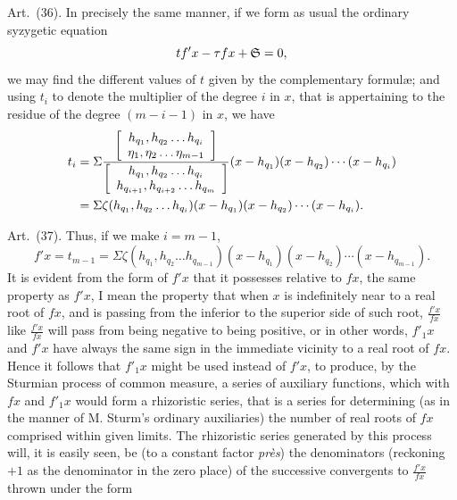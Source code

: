 \documentclass[11pt]{article}
\newcommand{\art}[1]{\par\smallskip\noindent Art.~(#1).\quad}
\begin{document}
\art{36} In precisely the same manner, if we form as usual the ordinary syzygetic equation
\[
tf'x-\tau fx+\mathfrak{S}=0,
\]
we may find the different values of $t$ given by the complementary formulæ; and using $t_i$ to denote the multiplier of the degree $i$ in $x$, that is appertaining to the residue of the degree $(m-i-1)$ in $x$, we have
\[
\begin{aligned}
t_i&=\Sigma
\frac{\left[\begin{array}{c}h_{q_1},h_{q_2}\ldots h_{q_i}\\\eta_1,\eta_2\ldots\eta_{m-1}\end{array}\right]}
{\left[\begin{array}{c}h_{q_1},h_{q_2}\ldots h_{q_i}\\h_{q_{i+1}},h_{q_{i+2}}\ldots h_{q_m}\end{array}\right]}
(x-h_{q_1})(x-h_{q_2})\cdots(x-h_{q_i})\\
&=\Sigma\zeta(h_{q_1},h_{q_2}\ldots h_{q_i})(x-h_{q_1})(x-h_{q_2})\cdots(x-h_{q_i}).
\end{aligned}
\]

\art{37} Thus, if we make $i=m-1$,
\[
f'x=t_{m-1}=\Sigma\zeta(h_{q_1},h_{q_2}\ldots h_{q_{m-1}})(x-h_{q_1})(x-h_{q_2})\cdots(x-h_{q_{m-1}}).
\]
It is evident from the form of $f'x$ that it possesses relative to $fx$, the same property as $f'x$, I mean the property that when $x$ is indefinitely near to a real root of $fx$, and is passing from the inferior to the superior side of such root, $\frac{f'x}{fx}$ like $\frac{f'x}{fx}$ will pass from being negative to being positive, or in other words, $f'_1x$ and $f'x$ have always the same sign in the immediate vicinity to a real root of $fx$. Hence it follows that $f'_1x$ might be used instead of $f'x$, to produce, by the Sturmian process of common measure, a series of auxiliary functions, which with $fx$ and $f'_1x$ would form a rhizoristic series, that is a series for determining (as in the manner of M. Sturm's ordinary auxiliaries) the number of real roots of $fx$ comprised within given limits. The rhizoristic series generated by this process will, it is easily seen, be (to a constant factor \emph{près}) the denominators (reckoning $+1$ as the denominator in the zero place) of the successive convergents to $\frac{f'x}{fx}$ thrown under the form
\end{document}
